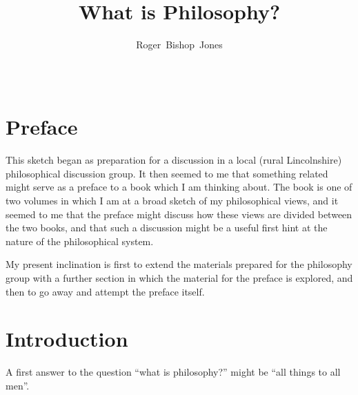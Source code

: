 \documentclass[10pt,titlepage]{article}
\title{What is Philosophy?}
\author{Roger~Bishop~Jones}
\date{\ }
\begin{document}
                               
\begin{titlepage}
\maketitle






\end{titlepage}

\setcounter{tocdepth}{2}
{\parskip-0pt\tableofcontents}



\section{Preface}

This sketch began as preparation for a discussion in a local (rural Lincolnshire) philosophical discussion group.
It then seemed to me that something related might serve as a preface to a book which I am thinking about.
The book is one of two volumes in which I am at a broad sketch of my philosophical views, and it seemed to me that the preface might discuss how these views are divided between the two books, and that such a discussion might be a useful first hint at the nature of the philosophical system.

My present inclination is first to extend the materials prepared for the philosophy group with a further section in which the material for the preface is explored, and then to go away and attempt the preface itself.

\section{Introduction}

A first answer to the question ``what is philosophy?'' might be ``all things to all men''.
\end{document}
